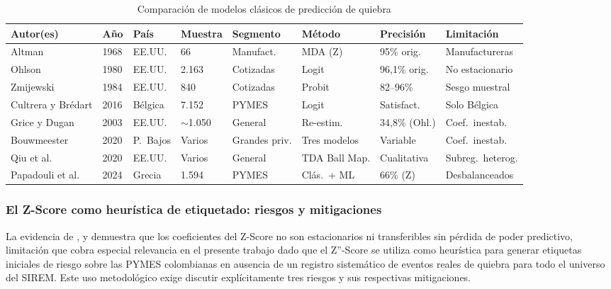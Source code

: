 \documentclass[12pt, letterpaper]{article}
\begin{document}
\begin{table}[htbp]
\centering
\caption{Comparaci\'on de modelos cl\'asicos de predicci\'on de quiebra}
\label{tab:clasicos}
\scriptsize
\setlength{\tabcolsep}{3pt}
\renewcommand{\arraystretch}{1.15}
\begin{tabularx}{\textwidth}{L{1.9cm} C{0.5cm} L{1.4cm} C{1cm} L{1.6cm} L{1.6cm} L{1.5cm} L{2.1cm}}
\toprule
\textbf{Autor(es)} & \textbf{A\~no} & \textbf{Pa\'is} & \textbf{Muestra} & \textbf{Segmento} & \textbf{M\'etodo} & \textbf{Precisi\'on} & \textbf{Limitaci\'on} \\
\midrule
Altman & 1968 & EE.UU. & 66 & Manufact. & MDA (Z) & 95\% orig. & Manufactureras \\
Ohlson & 1980 & EE.UU. & 2.163 & Cotizadas & Logit & 96,1\% orig. & No estacionario \\
Zmijewski & 1984 & EE.UU. & 840 & Cotizadas & Probit & 82--96\% & Sesgo muestral \\
Cultrera y Br\'edart & 2016 & B\'elgica & 7.152 & PYMES & Logit & Satisfact. & Solo B\'elgica \\
Grice y Dugan & 2003 & EE.UU. & $\sim$1.050 & General & Re-estim. & 34,8\% (Ohl.) & Coef.\ inestab. \\
Bouwmeester & 2020 & P.\ Bajos & Varios & Grandes priv. & Tres modelos & Variable & Coef.\ inestab. \\
Qiu et al. & 2020 & EE.UU. & Varios & General & TDA Ball Map. & Cualitativa & Subreg.\ heterog. \\
Papadouli et al. & 2024 & Grecia & 1.594 & PYMES & Cl\'as.\ + ML & 66\% (Z) & Desbalanceados \\
\bottomrule
\end{tabularx}
\renewcommand{\arraystretch}{1}
\end{table}

\subsubsection{El Z-Score como heur\'istica de etiquetado: riesgos y mitigaciones}
\label{sec:zscore-label}

La evidencia de \citet{Grice2003}, \citet{Bouwmeester2020} y \citet{Qiu2020} demuestra que los coeficientes del Z-Score no son estacionarios ni transferibles sin p\'erdida de poder predictivo, limitaci\'on que cobra especial relevancia en el presente trabajo dado que el Z''-Score se utiliza como heur\'istica para generar etiquetas iniciales de riesgo sobre las PYMES colombianas en ausencia de un registro sistem\'atico de eventos reales de quiebra para todo el universo del SIREM. Este uso metodol\'ogico exige discutir expl\'icitamente tres riesgos y sus respectivas mitigaciones.
\end{document}
